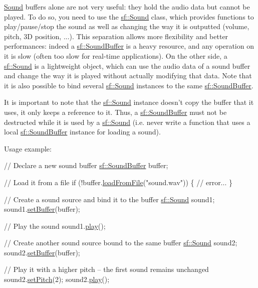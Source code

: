 \hyperlink{classsf_1_1_sound}{Sound} buffers alone are not very useful\-: they hold the audio data but cannot be played. To do so, you need to use the \hyperlink{classsf_1_1_sound}{sf\-::\-Sound} class, which provides functions to play/pause/stop the sound as well as changing the way it is outputted (volume, pitch, 3\-D position, ...). This separation allows more flexibility and better performances\-: indeed a \hyperlink{classsf_1_1_sound_buffer}{sf\-::\-Sound\-Buffer} is a heavy resource, and any operation on it is slow (often too slow for real-\/time applications). On the other side, a \hyperlink{classsf_1_1_sound}{sf\-::\-Sound} is a lightweight object, which can use the audio data of a sound buffer and change the way it is played without actually modifying that data. Note that it is also possible to bind several \hyperlink{classsf_1_1_sound}{sf\-::\-Sound} instances to the same \hyperlink{classsf_1_1_sound_buffer}{sf\-::\-Sound\-Buffer}.

It is important to note that the \hyperlink{classsf_1_1_sound}{sf\-::\-Sound} instance doesn't copy the buffer that it uses, it only keeps a reference to it. Thus, a \hyperlink{classsf_1_1_sound_buffer}{sf\-::\-Sound\-Buffer} must not be destructed while it is used by a \hyperlink{classsf_1_1_sound}{sf\-::\-Sound} (i.\-e. never write a function that uses a local \hyperlink{classsf_1_1_sound_buffer}{sf\-::\-Sound\-Buffer} instance for loading a sound).

Usage example\-: 
\begin{DoxyCode}
\textcolor{comment}{// Declare a new sound buffer}
\hyperlink{classsf_1_1_sound_buffer}{sf::SoundBuffer} buffer;

\textcolor{comment}{// Load it from a file}
\textcolor{keywordflow}{if} (!buffer.\hyperlink{classsf_1_1_sound_buffer_a2be6a8025c97eb622a7dff6cf2594394}{loadFromFile}(\textcolor{stringliteral}{"sound.wav"}))
\{
    \textcolor{comment}{// error...}
\}

\textcolor{comment}{// Create a sound source and bind it to the buffer}
\hyperlink{classsf_1_1_sound}{sf::Sound} sound1;
sound1.\hyperlink{classsf_1_1_sound_a8b395e9713d0efa48a18628c8ec1972e}{setBuffer}(buffer);

\textcolor{comment}{// Play the sound}
sound1.\hyperlink{classsf_1_1_sound_a2953ffe632536e72e696fd880ced2532}{play}();

\textcolor{comment}{// Create another sound source bound to the same buffer}
\hyperlink{classsf_1_1_sound}{sf::Sound} sound2;
sound2.\hyperlink{classsf_1_1_sound_a8b395e9713d0efa48a18628c8ec1972e}{setBuffer}(buffer);

\textcolor{comment}{// Play it with a higher pitch -- the first sound remains unchanged}
sound2.\hyperlink{classsf_1_1_sound_source_a72a13695ed48b7f7b55e7cd4431f4bb6}{setPitch}(2);
sound2.\hyperlink{classsf_1_1_sound_a2953ffe632536e72e696fd880ced2532}{play}();
\end{DoxyCode}


